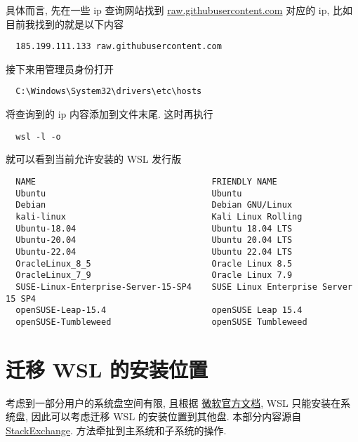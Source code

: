 \documentclass[fontset=founder]{ctexrep}
\begin{document}
具体而言,
先在一些 ip 查询网站找到 \url{raw.githubusercontent.com} 对应的 ip,
比如目前我找到的就是以下内容
\begin{lstlisting}
  185.199.111.133 raw.githubusercontent.com
\end{lstlisting}
接下来用管理员身份打开
\begin{lstlisting}
  C:\Windows\System32\drivers\etc\hosts
\end{lstlisting}
将查询到的 ip 内容添加到文件末尾.
这时再执行
\begin{lstlisting}
  wsl -l -o
\end{lstlisting}
就可以看到当前允许安装的 WSL 发行版
\begin{lstlisting}
  NAME                                   FRIENDLY NAME
  Ubuntu                                 Ubuntu
  Debian                                 Debian GNU/Linux
  kali-linux                             Kali Linux Rolling
  Ubuntu-18.04                           Ubuntu 18.04 LTS
  Ubuntu-20.04                           Ubuntu 20.04 LTS
  Ubuntu-22.04                           Ubuntu 22.04 LTS
  OracleLinux_8_5                        Oracle Linux 8.5
  OracleLinux_7_9                        Oracle Linux 7.9
  SUSE-Linux-Enterprise-Server-15-SP4    SUSE Linux Enterprise Server 15 SP4
  openSUSE-Leap-15.4                     openSUSE Leap 15.4
  openSUSE-Tumbleweed                    openSUSE Tumbleweed
\end{lstlisting}

\section{迁移 WSL 的安装位置}

考虑到一部分用户的系统盘空间有限,
且根据%
\href{https://learn.microsoft.com/zh-cn/windows/wsl/troubleshooting?source=recommendations#installation-issues}{微软官方文档},
WSL 只能安装在系统盘,
因此可以考虑迁移 WSL 的安装位置到其他盘.
本部分内容源自
\href{https://superuser.com/questions/1701175/installing-ubuntu-on-mnt-d-with-wsl}{StackExchange}.
方法牵扯到主系统和子系统的操作.
\end{document}
